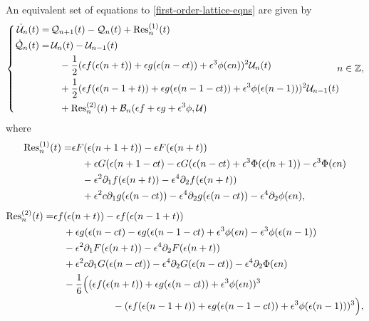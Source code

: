 An equivalent set of equations to \cref{first-order-lattice-eqns} are given by
\begin{equation}\label{error-lattice-eqns}
	\left\{\begin{aligned}
			\dot{\mathcal U}_n(t) =& \, \mathcal Q_{n+1}(t) - \mathcal Q_n(t) +\mathrm{Res}_n^{(1)}(t) \\
\dot{\mathcal Q}_n(t) =& \, \mathcal U_n(t) - \mathcal U_{n-1}(t)  \\
&\quad - \frac 1 2 (\epsilon f(\epsilon(n+t)) + \epsilon g(\epsilon(n-ct)) + \epsilon^3\phi(\epsilon n))^2 \mathcal U_{n}(t) \\
&\quad + \frac 12  (\epsilon f(\epsilon(n-1+t)) + \epsilon g(\epsilon(n-1-ct)) + \epsilon^3\phi(\epsilon (n-1)))^2 \mathcal U_{n-1}(t) \\
&\quad +\mathrm{Res}_n^{(2)}(t) + \mathcal B_n(\epsilon f + \epsilon g + \epsilon^3 \phi,  \mathcal U) 
	\end{aligned} \right. \hspace{-0.5em}n\in\mathbb{Z},
\end{equation}
where
\begin{equation}
\begin{aligned}
	\mathrm{Res}_n^{(1)}(t) =& \epsilon F(\epsilon(n+1+t)) - \epsilon F(\epsilon(n+t)) \\
	&\quad + \epsilon G(\epsilon(n+1-c t) - \epsilon G(\epsilon(n-c t) + \epsilon^3 \Phi(\epsilon (n+1))   - \epsilon^3 \Phi(\epsilon n) \\
	&\quad - \epsilon^2 \partial_1 f(\epsilon(n+t)) - \epsilon^4 \partial_2
	f(\epsilon(n+t)) \\
	&\quad + \epsilon^2 c \partial_1 g(\epsilon(n-ct)) - \epsilon^4 \partial_2 g(\epsilon(n-ct)) - \epsilon^4 \partial_2 \phi(\epsilon n) ,
\end{aligned}
\end{equation}
\begin{equation}
\begin{aligned}
	\mathrm{Res}_n^{(2)}(t) =& \epsilon f(\epsilon(n+t)) - \epsilon f(\epsilon(n-1+t)) \\
	&\quad+ \epsilon g(\epsilon(n-c t) - \epsilon g(\epsilon(n-1-c t) + \epsilon^3 \phi(\epsilon n) - \epsilon^3 \phi(\epsilon (n-1)) \\
	&\quad - \epsilon^2 \partial_1 F(\epsilon(n+t)) - \epsilon^4 \partial_2
	F(\epsilon(n+t)) \\
	&\quad + \epsilon^2 c \partial_1 G(\epsilon(n-ct)) - \epsilon^4 \partial_2 G(\epsilon(n-ct)) - \epsilon^4 \partial_2 \Phi(\epsilon n) \\
	&\quad - \frac 1 6 \Big( (\epsilon f(\epsilon(n+t)) + \epsilon g(\epsilon(n-c t)) + \epsilon^3 \phi(\epsilon n))^3 \\
	&\hspace{6em} - (\epsilon f(\epsilon(n-1+t)) + \epsilon g(\epsilon(n-1-c t)) + \epsilon^3 \phi(\epsilon (n-1)))^3 \Big),
\end{aligned}
\end{equation}
